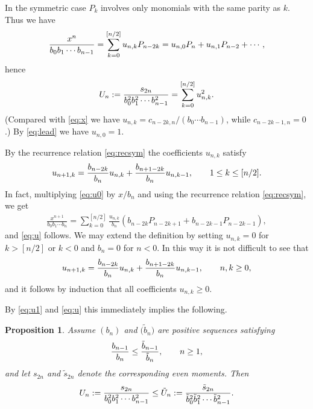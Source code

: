 \documentclass[pdftex]{sigma}
\numberwithin{equation}{section}
\newtheorem{prop}[thm]{Proposition}
\begin{document}
In the symmetric case $P_k$ involves only monomials with the same parity as $k$. Thus we have
 \begin{gather}\label{eq:u0}
{x^n\over b_0b_1\cdots b_{n-1}}=\sum_{k=0}^{[n/2]}u_{n,k}P_{n-2k}=u_{n,0}P_n+u_{n,1}P_{n-2}+\cdots,
\end{gather}
 hence
 \begin{gather}\label{eq:u1}
U_n:= {s_{2n}\over b_0^2b_1^2\cdots b_{n-1}^2}=\sum_{k=0}^{[n/2]}u_{n,k}^2.
 \end{gather}
(Compared with \eqref{eq:x} we have $u_{n,k}=c_{n-2k,n}/(b_0\cdots b_{n-1})$, while $c_{n-2k-1,n}=0$.) By \eqref{eq:lead} we have $u_{n,0}=1$.

By the recurrence relation \eqref{eq:recsym} the coefficients $u_{n,k}$ satisfy
\begin{gather}\label{eq:u}
u_{n+1,k}={b_{n-2k}\over b_n} u_{n,k}+{b_{n+1-2k}\over b_n}u_{n,k-1},\qquad 1\le k\le [n/2].
\end{gather}
In fact, multiplying \eqref{eq:u0} by $x/b_n$ and using the recurrence relation \eqref{eq:recsym}, we get
\begin{gather*}
\frac{x^{n+1}}{b_0b_1\cdots b_n}=\sum_{k=0}^{[n/2]}\frac{u_{n,k}}{b_n}\left(b_{n-2k}P_{n-2k+1}+b_{n-2k-1}P_{n-2k-1}\right),
\end{gather*}
and \eqref{eq:u} follows. We may extend the definition by setting $u_{n,k}=0$ for $k>[n/2]$ or $k<0$ and $b_n=0$ for $n<0$. In this way it is not difficult to see that
 \begin{gather}\label{eq:u'}
u_{n+1,k}={b_{n-2k}\over b_n} u_{n,k}+{b_{n+1-2k}\over b_n}u_{n,k-1},\qquad n, k\ge 0,
\end{gather}
and it follows by induction that all coefficients $u_{n,k}\ge 0$.

By \eqref{eq:u1} and \eqref{eq:u} this immediately implies the following.

\begin{prop}\label{thm:comparison} Assume $(b_n)$ and $\big(\tilde{b}_n\big)$ are positive sequences satisfying
\begin{gather*}
{b_{n-1}\over b_{n}} \le {\tilde{b}_{n-1}\over \tilde{b}_{n}} ,\qquad n\ge 1,
\end{gather*}
 and let $s_{2n}$ and $\tilde{s}_{2n}$ denote the corresponding even moments. Then
\begin{gather*}
 U_n:={s_{2n}\over b_0^2b_1^2\cdots b_{n-1}^2} \le \tilde{U}_n:={\tilde{s}_{2n}\over \tilde{b}_0^2\tilde{b}_1^2\cdots \tilde{b}_{n-1}^2}.
\end{gather*}
\end{prop}
\end{document}
